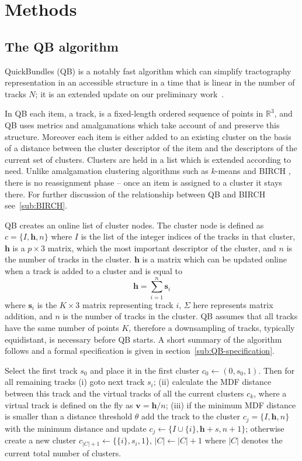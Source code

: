 \documentclass[preprint,authoryear,a4paper,10pt,onecolumn]{elsarticle}
\begin{document}
\section{Methods}

\subsection{The QB algorithm\label{sub:QB-description}}

QuickBundles (QB) is a notably fast algorithm which can simplify
tractography representation in an accessible structure in a time that is
linear in the number of tracks $N$; it is an extended update on our
preliminary work~\citep{EGMB10}.

In QB each item, a track, is a fixed-length ordered sequence of points
in $\mathbb{R}^{3}$, and QB uses metrics and amalgamations which take
account of and preserve this structure.  Moreover each item is either
added to an existing cluster on the basis of a distance between the
cluster descriptor of the item and the descriptors of the current set of
clusters. Clusters are held in a list which is extended according to
need. Unlike amalgamation clustering algorithms such as $k$-means
\citep{steinhaus1956division, macqueen1967some} and BIRCH
\citep{zhang1997birch}, there is no reassignment phase -- once an item
is assigned to a cluster it stays there. For further discussion of the
relationship between QB and BIRCH see~\ref{sub:BIRCH}.

QB creates an online list of cluster nodes. The cluster node is defined
as $c=\{I,\mathbf{h},n\}$ where $I$ is the list of the integer indices
of the tracks in that cluster, $\mathbf{h}$ is a $p\times3$ matrix,
which the most important descriptor of the cluster, and $n$ is the
number of tracks in the cluster. $\mathbf{h}$ is a matrix which can be
updated online when a track is added to a cluster and is equal to
\begin{equation}
  \mathbf{h}=\sum_{i=1}^{n}\mathbf{s}_{i}
\end{equation} 
where $\mathbf{s}_{i}$ is the $K\times3$ matrix representing track $i$,
$\Sigma$ here represents matrix addition, and $n$ is the number of
tracks in the cluster. QB assumes that all tracks have the same number
of points $K$, therefore a downsampling of tracks, typically
equidistant, is necessary before QB starts. A short summary of the
algorithm follows and a formal specification is given in
section~\ref{sub:QB-specification}.

Select the first track $s_{0}$ and place it in the first cluster
$c_{0}\leftarrow({0},s_{0},1)$. Then for all remaining tracks (i) goto
next track $s_{i}$; (ii) calculate the MDF distance between this track and
the virtual tracks of all the current clusters $c_{k}$, where a virtual track
is defined on the fly as $\mathbf{v}=\mathbf{h}/n$; (iii) if the minimum
MDF distance is smaller than a distance threshold
$\theta$ add the track to the cluster
$c_{j}=\{I,\mathbf{h},n\}$ with the minimum distance and update
$c_{j}\leftarrow\{I\cup\{i\},\mathbf{h}+s,n+1\}$; otherwise create a new
cluster $c_{|C|+1}\leftarrow\{\{i\},s_{i},1\}$, $|C|\leftarrow|C|+1$ where
$|C|$ denotes the current total number of clusters. 
\end{document}
